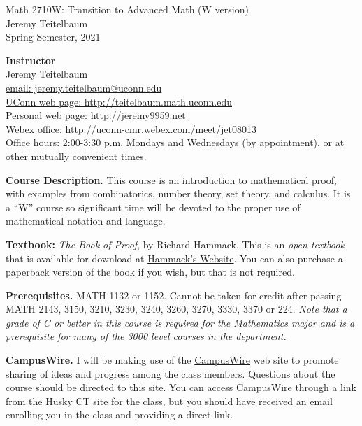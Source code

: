 \documentclass[12pt]{article}
\begin{document}
\begin{center} Math 2710W: Transition to Advanced Math (W version)\\
Jeremy Teitelbaum \\ Spring Semester, 2021
\end{center}

{\bf Instructor}\\
Jeremy Teitelbaum \\
\href{mailto:jeremy.teitelbaum@uconn.edu}{email: jeremy.teitelbaum@uconn.edu} \\
\href{http://teitelbaum.math.uconn.edu}{UConn web page: http://teitelbaum.math.uconn.edu} \\
\href{http://jeremy9959.net}{Personal web page: http://jeremy9959.net} \\
\href{http://uconn-cmr.webex.com/meet/jet08013}{Webex office: http://uconn-cmr.webex.com/meet/jet08013} \\
Office hours: 2:00-3:30 p.m. Mondays and Wednesdays (by appointment), or at other mutually convenient times.  

{\bf Course Description.} This course is an introduction to mathematical proof, with examples from
combinatorics, number theory, set theory, and calculus.  It is a ``W'' course so significant time
will be devoted to the proper use of mathematical notation and language.


{\bf Textbook:} {\it The Book of Proof}, by Richard Hammack.  This is an {\it open textbook} that is available
for download at \href{https://www.people.vcu.edu/~rhammack/BookOfProof}{Hammack's Website}. You can also purchase a paperback
version of the book if you wish, but that is not required. 

{\bf Prerequisites.} MATH 1132 or 1152. Cannot be taken for credit after passing MATH 2143, 3150, 3210, 3230, 3240, 3260, 3270, 3330, 3370 or 224. {\it Note that a grade of C or better in this course is required for the Mathematics major and is a prerequisite for many of the 3000 level courses in the department.}


{\bf CampusWire.} I will be making use of the \href{https://campuswire.com/c/G97D45E8B/feed/1}{CampusWire}
web site to promote sharing of ideas and progress among the class members.
Questions about the course should be directed to this  site.  You can access CampusWire
through a link from the  Husky CT site for the class, but you should have received an email enrolling
you in the class and providing a direct link.
\end{document}
